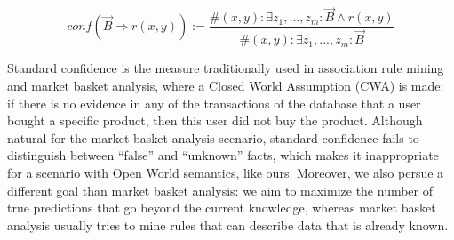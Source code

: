 \[conf(\vec{B} \Rightarrow r(x,y)) := \frac{\#(x,y): \exists z_1,...,z_m: \vec{B} \wedge r(x,y)}{\#(x,y): \exists z_1,...,z_m: \vec{B}}\]

Standard confidence is the measure traditionally used in association rule mining and market basket analysis, where a Closed World Assumption (CWA) is made: 
if there is no evidence in any of the transactions of the database that a user bought a specific product, then this user did not buy the product.
Although natural for the market basket analysis scenario, standard confidence fails to distinguish between ``false'' and ``unknown'' facts, 
which makes it inappropriate for a scenario with Open World semantics, like ours. Moreover, we also persue a different goal than market basket analysis:
we aim to maximize the number of true predictions that go beyond the current knowledge, whereas market basket analysis usually tries to mine rules that can describe data that is already known. 









